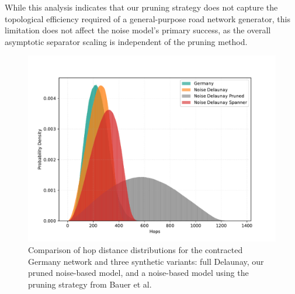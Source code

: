 While this analysis indicates that our pruning strategy does not capture the topological efficiency required of a general-purpose road network generator, this limitation does not affect the noise model's primary success, as the overall asymptotic separator scaling is independent of the pruning method.

\begin{figure}[tbhp]
    \centering
    \includegraphics[width=0.6\linewidth]{graphics/hop_distance_compare.pdf}
    \caption{Comparison of hop distance distributions for the contracted Germany network and three synthetic variants: full Delaunay, our pruned noise-based model, and a noise-based model using the pruning strategy from Bauer et al.}
    \label{fig:hop_dist_germany_comparison}
\end{figure}
